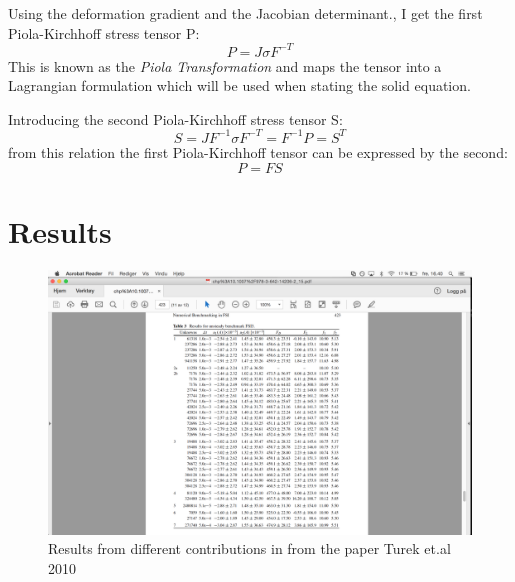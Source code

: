 Using the deformation gradient and the Jacobian determinant., I get the first Piola-Kirchhoff stress tensor P:
\begin{equation}
 P = J \sigma F^{-T} 
\end{equation}
This is known as the \textit{Piola Transformation} and maps the tensor into a Lagrangian formulation which will be used when stating the solid equation.

Introducing the second Piola-Kirchhoff stress tensor S:
\begin{equation}
S = J F^{-1}\sigma F^{-T} = F^{-1} P = S^T 
\end{equation}
from this relation the first Piola-Kirchhoff tensor can be expressed by the second:
\begin{equation}
P = FS
\end{equation}


\chapter{Results}\label{sec:bigboys}
\begin{figure}[H]
\includegraphics[scale=0.7,trim={12cm 0cm 16.3cm 5.5cm},clip]{./Appendix/BigBoyResults.png}
\caption{Results from different contributions in from the paper Turek et.al 2010 \cite{Turek2010}}
\end{figure}









